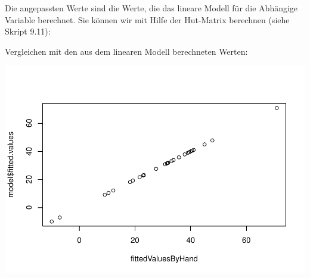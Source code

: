 \documentclass[]{article}
\newenvironment{Shaded}{\begin{snugshade}}{\end{snugshade}}
\newcommand{\DataTypeTok}[1]{\textcolor[rgb]{0.13,0.29,0.53}{#1}}
\newcommand{\DecValTok}[1]{\textcolor[rgb]{0.00,0.00,0.81}{#1}}
\newcommand{\KeywordTok}[1]{\textcolor[rgb]{0.13,0.29,0.53}{\textbf{#1}}}
\newcommand{\NormalTok}[1]{#1}
\newcommand{\OperatorTok}[1]{\textcolor[rgb]{0.81,0.36,0.00}{\textbf{#1}}}
\newcommand{\StringTok}[1]{\textcolor[rgb]{0.31,0.60,0.02}{#1}}
\begin{document}
Die angepassten Werte sind die Werte, die das lineare Modell für die Abhängige Variable berechnet.
Sie können wir mit Hilfe der Hut-Matrix berechnen (siehe Skript 9.11):

\begin{Shaded}
\end{Shaded}

Vergleichen mit den aus dem linearen Modell berechneten Werten:

\begin{Shaded}
\end{Shaded}

\includegraphics{BelaSchinkeAusarbeitung_files/figure-latex/unnamed-chunk-15-1.pdf}
\end{document}

